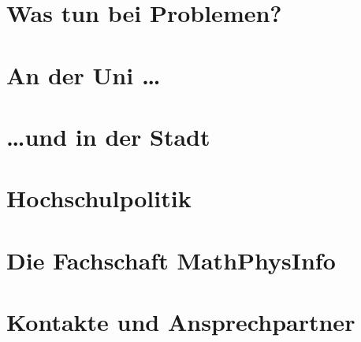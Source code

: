 \documentclass[ngerman,a4paper,openany,twocolumn,showtrims]{memoir}
\begin{document}
\chapter{Was tun bei Problemen?}






\chapter{An der Uni \dots}










\chapter{\dots und in der Stadt}







\chapter{Hochschulpolitik}



\chapter{Die Fachschaft MathPhysInfo}
\label{diefsmathphys}


% 

%

\onecolumn %
\chapter{Kontakte und Ansprechpartner}




\printglossaries{}
\end{document}
